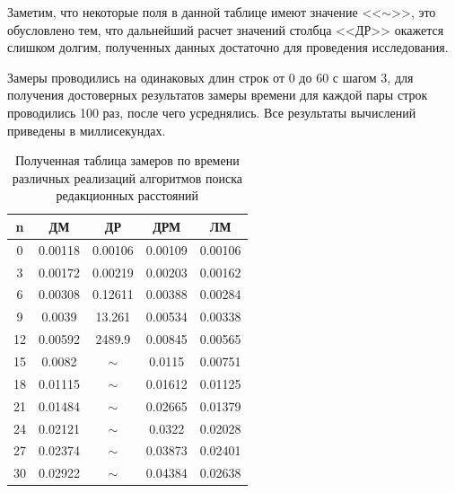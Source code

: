 Заметим, что некоторые поля в данной таблице
имеют значение <<$\sim$>>, это обусловлено тем, что дальнейший расчет значений столбца <<ДР>> окажется слишком
долгим, полученных данных достаточно для проведения исследования.

Замеры проводились на одинаковых длин строк от 0 до 60 с шагом 3, для получения достоверных результатов замеры 
времени для каждой пары строк проводились 100 раз, после чего усреднялись. Все результаты вычислений приведены в миллисекундах.






\begin{table}[!ht]
	\centering
	\caption{Полученная таблица замеров по времени различных реализаций алгоритмов поиска редакционных расстояний}
	\begin{tabular}{|c|c|c|c|c|}
		\hline
		n  & ДМ & ДР & ДРМ & ЛМ \\
  \hline
	0  & 0.00118            & 0.00106               & 0.00109                     & 0.00106                \\  \hline
	3  & 0.00172            & 0.00219               & 0.00203                     & 0.00162                \\ \hline
	6  & 0.00308            & 0.12611               & 0.00388                     & 0.00284                \\ \hline
	9  & 0.0039             & 13.261                & 0.00534                     & 0.00338                \\ \hline
	12 & 0.00592            & 2489.9                & 0.00845                     & 0.00565                \\ \hline
	15 & 0.0082             & $\sim$                & 0.0115                      & 0.00751                \\ \hline
	18 & 0.01115            & $\sim$                & 0.01612                     & 0.01125                \\ \hline
	21 & 0.01484            & $\sim$                & 0.02665                     & 0.01379                \\ \hline
	24 & 0.02121            & $\sim$                & 0.0322                      & 0.02028                \\ \hline
	27 & 0.02374            & $\sim$                & 0.03873                     & 0.02401                \\ \hline
	30 & 0.02922            & $\sim$                & 0.04384                     & 0.02638                \\ \hline

\end{tabular}
\end{table}
